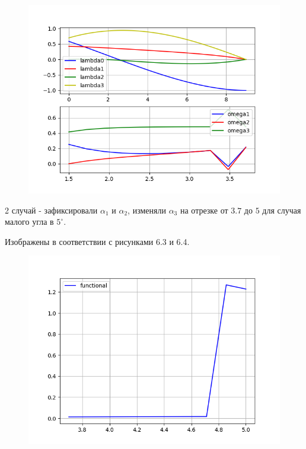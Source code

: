 \documentclass[14pt]{extreport}
\begin{document}
\begin{figure}[H]
\center\includegraphics[scale=0.8]{fig/ivp_and_control_1_5-3_7_50.png}
\caption{}
\end{figure}

2 случай - зафиксировали $\alpha_1$ и $\alpha_2$, изменяли $\alpha_3$ на отрезке от $3.7$ до $5$ для случая малого угла в $5^{\circ}$.

Изображены в соответствии с рисунками 6.3 и 6.4.

\begin{figure}[H]
\center\includegraphics[scale=0.8]{fig/functional_3_7-5_5.png}
\caption{}
\end{figure}
\end{document}
